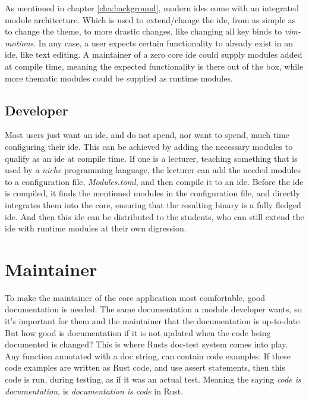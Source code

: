 As mentioned in chapter \ref{cha:background}, modern \gls{ide}s come with an
integrated module architecture. Which is used to extend/change the \gls{ide},
from as simple as to change the theme, to more drastic changes, like changing
all key binds to \textit{vim-motions}. In any case, a user expects certain
functionality to already exist in an \gls{ide}, like text editing. A maintainer
of a zero core \gls{ide} could supply modules added at compile time, meaning the
expected functionality is there out of the box, while more thematic modules
could be supplied as runtime modules.


\subsection{Developer}

Most users just want an \gls{ide}, and do not spend, nor want to spend, much
time configuring their \gls{ide}. This can be achieved by adding the necessary
modules to qualify as an \gls{ide} at compile time. If one is a lecturer,
teaching something that is used by a \textit{niche} programming language, the
lecturer can add the needed modules to a configuration file,
\textit{Modules.toml}, and then compile it to an \gls{ide}. Before the \gls{ide}
is compiled, it finds the mentioned modules in the configuration file, and
directly integrates them into the core, ensuring that the resulting binary is a
fully fledged \gls{ide}. And then this \gls{ide} can be distributed to the
students, who can still extend the \gls{ide} with runtime modules at their own
digression.

\section{Maintainer}

To make the maintainer of the core application most comfortable, good
documentation is needed. The same documentation a module developer wants, so
it's important for them and the maintainer that the documentation is up-to-date.
But how good is documentation if it is not updated when the code being
documented is changed? This is where Rusts doc-test system comes into play. Any
function annotated with a doc string, can contain code examples. If these code
examples are written as Rust code, and use assert statements, then this code is
run, during testing, as if it was an actual test. Meaning the saying
\textit{code is documentation}, is \textit{documentation is code} in Rust.

